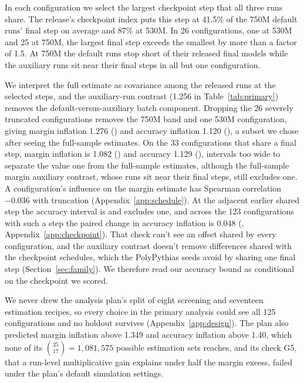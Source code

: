 In each configuration we select the largest checkpoint step that all three runs share. The release's checkpoint index puts this step at 41.5\% of the 750M default runs' final step on average and 87\% at 530M. In 26 configurations, one at 530M and 25 at 750M, the largest final step exceeds the smallest by more than a factor of 1.5. At 750M the default runs stop short of their released final models while the auxiliary runs sit near their final steps in all but one configuration.

We interpret the full estimate as covariance among the released runs at the selected steps, and the auxiliary-run contrast (1.256 in Table~\ref{tab:primary}) removes the default-versus-auxiliary batch component. Dropping the 26 severely truncated configurations removes the 750M band and one 530M configuration, giving margin inflation 1.276 () and accuracy inflation 1.120 (), a subset we chose after seeing the full-sample estimates. On the 33 configurations that share a final step, margin inflation is 1.082 () and accuracy 1.129 (), intervals too wide to separate the value one from the full-sample estimates, although the full-sample margin auxiliary contrast, whose runs sit near their final steps, still excludes one. A configuration's influence on the margin estimate has Spearman correlation $-0.036$ with truncation (Appendix~\ref{app:schedule}). At the adjacent earlier shared step the accuracy interval is  and excludes one, and across the 123 configurations with such a step the paired change in accuracy inflation is 0.048 (, Appendix~\ref{app:checkpoint}). That check can't see an offset shared by every configuration, and the auxiliary contrast doesn't remove differences shared with the checkpoint schedules, which the PolyPythias seeds avoid by sharing one final step (Section~\ref{sec:family}). We therefore read our accuracy bound as conditional on the checkpoint we scored.

We never drew the analysis plan's split of eight screening and seventeen estimation recipes, so every choice in the primary analysis could see all 125 configurations and no holdout survives (Appendix~\ref{app:design}). The plan also predicted margin inflation above 1.349 and accuracy inflation above 1.40, which none of its $\binom{25}{17}=1{,}081{,}575$ possible estimation sets reaches, and its check G5, that a run-level multiplicative gain explains under half the margin excess, failed under the plan's default simulation settings.

